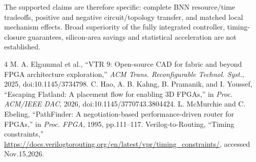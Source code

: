 \documentclass[conference,10pt]{IEEEtran}
\begin{document}
The supported claims are therefore specific: complete BNN resource/time tradeoffs, positive and negative circuit/topology transfer, and matched local mechanism effects. Broad superiority of the fully integrated controller, timing-closure guarantees, silicon-area savings and statistical acceleration are not established.
\begin{thebibliography}{4}
 M. A. Elgammal et al., ``VTR 9: Open-source CAD for fabric and beyond FPGA architecture exploration,'' \emph{ACM Trans. Reconfigurable Technol. Syst.}, 2025, doi:10.1145/3734798.
 C. Hao, A. B. Kahng, B. Pramanik, and I. Youssef, ``Escaping Flatland: A placement flow for enabling 3D FPGAs,'' in \emph{Proc. ACM/IEEE DAC}, 2026, doi:10.1145/3770743.3804424.
 L. McMurchie and C. Ebeling, ``PathFinder: A negotiation-based performance-driven router for FPGAs,'' in \emph{Proc. FPGA}, 1995, pp.111--117.
 Verilog-to-Routing, ``Timing constraints,'' \url{https://docs.verilogtorouting.org/en/latest/vpr/timing_constraints/}, accessed Nov.15,2026.
\end{thebibliography}
\end{document}
